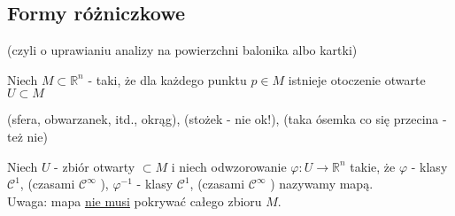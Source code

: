 \documentclass[../main.tex]{subfiles}
\begin{document}
\subsection{Formy różniczkowe}
(czyli o uprawianiu analizy na powierzchni balonika albo kartki)

Niech $M\subset\mathbb{R}^n$ - taki, że dla każdego punktu $p\in M$ istnieje otoczenie otwarte $U\subset M$
\begin{przyklad}
    (sfera, obwarzanek, itd., okrąg), (stożek - nie ok!), (taka ósemka co się przecina - też nie)
\end{przyklad}
\begin{definicja}
Niech $U$ - zbiór otwarty $\subset M$ i niech odwzorowanie $\varphi: U\to \mathbb{R}^n$ takie, że $\varphi$ - klasy $\mathcal{C}^1$, (czasami $\mathcal{C}^\infty$ ), $\varphi^{-1}$ - klasy $\mathcal{C}^1$, (czasami $\mathcal{C}^\infty$ ) nazywamy mapą.\\
Uwaga: mapa \underline{nie musi} pokrywać całego zbioru $M$.
\end{definicja}
\end{document}
